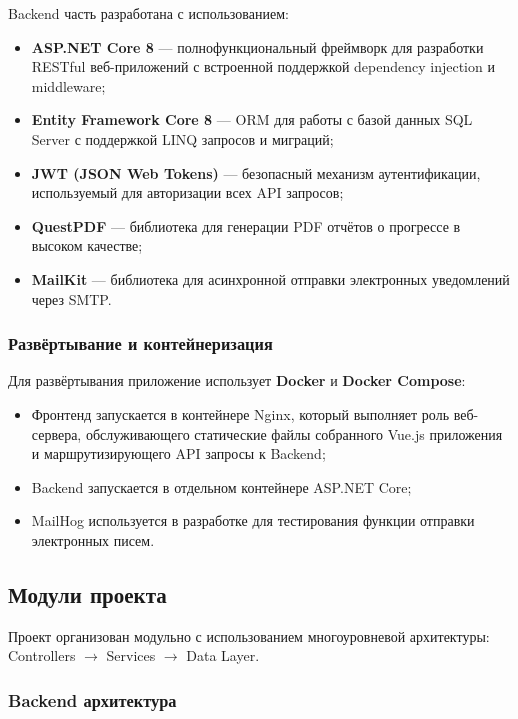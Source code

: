 Backend часть разработана с использованием:
\begin{itemize}
    \item \textbf{ASP.NET Core 8} --- полнофункциональный фреймворк для разработки RESTful веб-приложений с встроенной поддержкой dependency injection и middleware;
    \item \textbf{Entity Framework Core 8} --- ORM для работы с базой данных SQL Server с поддержкой LINQ запросов и миграций;
    \item \textbf{JWT (JSON Web Tokens)} --- безопасный механизм аутентификации, используемый для авторизации всех API запросов;
    \item \textbf{QuestPDF} --- библиотека для генерации PDF отчётов о прогрессе в высоком качестве;
    \item \textbf{MailKit} --- библиотека для асинхронной отправки электронных уведомлений через SMTP.
\end{itemize}

\subsubsection{Развёртывание и контейнеризация}

Для развёртывания приложение использует \textbf{Docker} и \textbf{Docker Compose}:

\begin{itemize}
    \item Фронтенд запускается в контейнере Nginx, который выполняет роль веб-сервера, обслуживающего статические файлы собранного Vue.js приложения и маршрутизирующего API запросы к Backend;
    \item Backend запускается в отдельном контейнере ASP.NET Core;
    \item MailHog используется в разработке для тестирования функции отправки электронных писем.
\end{itemize}


\subsection{Модули проекта}

Проект организован модульно с использованием многоуровневой архитектуры: Controllers $\to$ Services $\to$ Data Layer.

\subsubsection{Backend архитектура}

